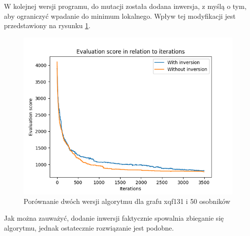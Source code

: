 \documentclass[11pt]{article}
\begin{document}
W kolejnej wersji programu, do mutacji została dodana inwersja, z myślą o tym,
aby ograniczyć wpadanie do minimum lokalnego. Wpływ tej modyfikacji jest
przedstawiony na rysunku \cref{fig:comparison}.
\begin{figure}
    \centering
    \includegraphics[scale=0.9]{img/comparison_50p_131.png}
    \caption{Porównanie dwóch wersji algorytmu dla grafu xqf131 i 50 osobników}
    \label{fig:comparison}
\end{figure}
Jak można zauważyć, dodanie inwersji faktycznie spowalnia zbieganie się
algorytmu, jednak ostatecznie rozwiązanie jest podobne.
\end{document}
